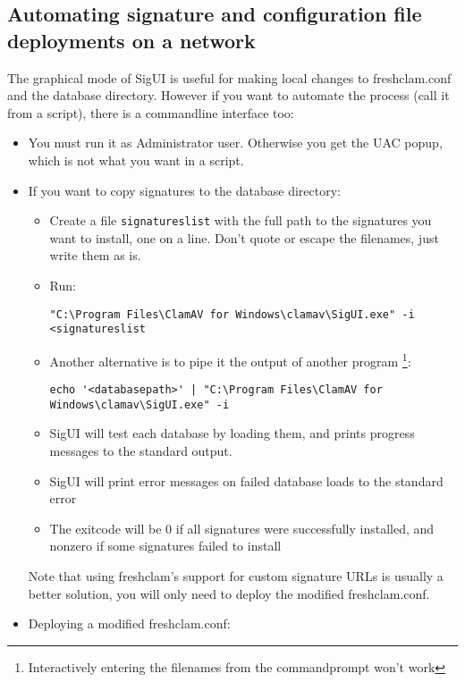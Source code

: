 \subsection{Automating signature and configuration file deployments on a network}
\label{sec:customautomatedcopy}
\label{sec:deploy_conf}

The graphical mode of SigUI is useful for making local changes to \gls{freshclam.conf} and the database directory. However if you want to automate the process (call it from a script), there is a commandline interface too:
\begin{itemize}
	\item You must run it as Administrator user. Otherwise you get the \gls{UAC} popup, which is not what you want in a script.
	\item If you want to copy signatures to the database directory:
		\begin{itemize}
			\item Create a file \verb+signatureslist+ with the full path to the signatures you want to install, one on a line. Don't quote or escape the filenames, just write them as is.
			\item Run:
\begin{lstlisting}
"C:\Program Files\ClamAV for Windows\clamav\SigUI.exe" -i <signatureslist
\end{lstlisting}
			\item Another alternative is to pipe it the output of another program \footnote{Interactively entering the filenames from the commandprompt won't work}:
\begin{lstlisting}
echo '<databasepath>' | "C:\Program Files\ClamAV for Windows\clamav\SigUI.exe" -i
\end{lstlisting}
			\item SigUI will test each database by loading them, and prints progress messages to the standard output.
			\item SigUI will print error messages on failed database loads to the standard error
			\item The exitcode will be 0 if all signatures were successfully installed, and nonzero if some signatures failed to install
		\end{itemize}
Note that using \gls{freshclam}'s support for custom signature URLs is usually a better solution, you will only need to deploy the modified \gls{freshclam.conf}.
\item Deploying a modified \gls{freshclam.conf}:


\end{itemize}
